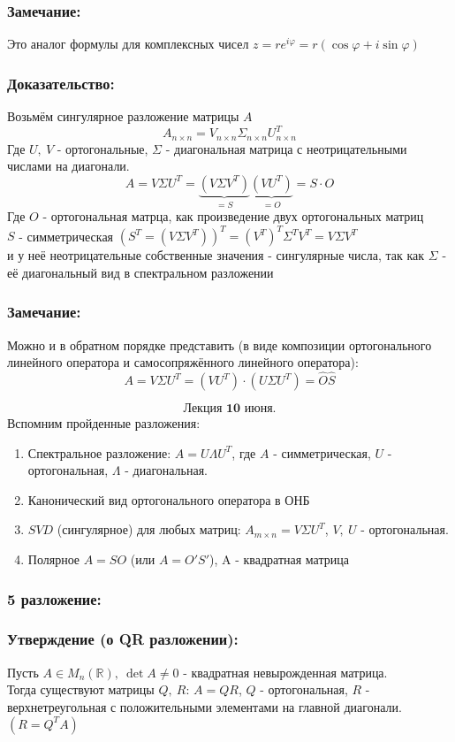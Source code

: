 \documentclass[12pt, letterpaper, twoside]{article}
\newcommand{\mb}[1]{\mathbb{#1}}
\begin{document}
    \subsubsection*{Замечание:}
    Это аналог формулы для комплексных чисел $z = re^{i\varphi} = r(\cos \varphi + i\sin \varphi)$
    \subsubsection*{Доказательство:}
    Возьмём сингулярное разложение матрицы $A$
    \[A_{n\times n} = V_{n\times n} \Sigma_{n\times n} U^T_{n\times n}\]
    Где $U,\ V$ - ортогональные, $\Sigma$ - диагональная матрица с неотрицательными числами на диагонали.
    \[A = V\Sigma U^T = \underset{=S}{\underbrace{(V \Sigma V^T)}}\underset{=O}{\underbrace{(VU^T)}} = S\cdot O\]
    Где $O$ - ортогональная матрца, как произведение двух ортогональных матриц\\
    $S$ - симметрическая $(S^T = (V\Sigma V^T))^T = (V^T)^T \Sigma^T V^T = V\Sigma V^T$\\
    и у неё неотрицательные собственные значения - сингулярные числа, так как $\Sigma$ - её диагональный вид в спектральном разложении
    \subsubsection*{Замечание:}
    Можно и в обратном порядке представить (в виде композиции ортогонального линейного оператора и самосопряжённого линейного оператора):
    \[A = V\Sigma U^T = (VU^T)\cdot (U\Sigma U^T) = \hat{O}\hat{S}\]

\[\textbf{Лекция 10 июня.}\]
    Вспомним пройденные разложения:
    \begin{enumerate}
        \item Спектральное разложение: $A = U\Lambda U^T$, где $A$ - симметрическая, $U$ - ортогональная, $\Lambda$ - диагональная.
        \item Канонический вид ортогонального оператора в ОНБ
        \item $SVD$ (сингулярное) для любых матриц: $A_{m\times n} = V \Sigma U^T$, $V,\ U$ - ортогональная.
        \item Полярное $A = SO$ (или $A = O'S'$), A - квадратная матрица
    \end{enumerate}
    \subsubsection*{5 разложение:}
    \subsubsection*{Утверждение (о QR разложении):}
    Пусть $A \in M_{n}(\mb{R}),\ \det A \neq 0$ - квадратная невырожденная матрица.\\
    Тогда существуют матрицы $Q,\ R$: $A = QR$, $Q$ - ортогональная, $R$ - верхнетреугольная с положительными элементами на главной диагонали. $(R = Q^T A)$
\end{document}
